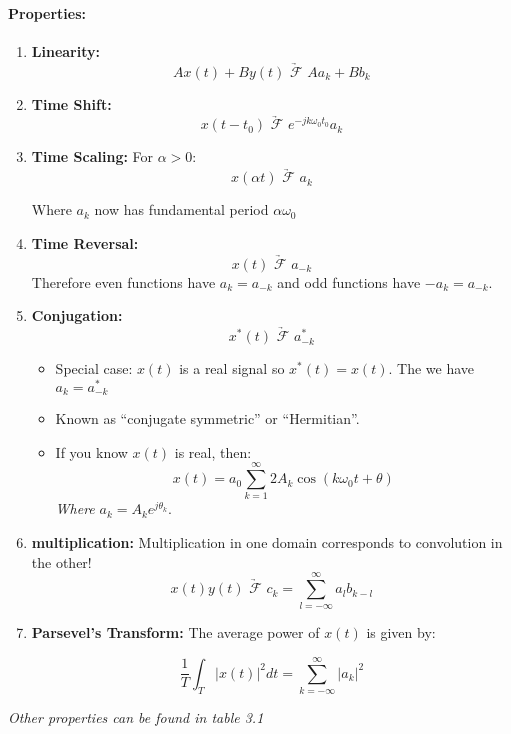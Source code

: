 \documentclass[a4paper,12pt]{report}
\begin{document}
\paragraph{Properties: } 

\begin{enumerate}
\item \textbf{Linearity: } 
\begin{equation}
Ax(t) + By(t) \underrightarrow{\,\,\mathcal{F}\,\,} Aa_k + Bb_k
\end{equation}

\item \textbf{Time Shift: } 
\begin{equation}
x(t-t_0) \underrightarrow{\,\,\mathcal{F}\,\,} e^{-jk\omega_0 t_0} a_k
\end{equation}


\item \textbf{Time Scaling: } For $\alpha > 0$: 
\begin{equation}
x(\alpha t) \underrightarrow{\,\,\mathcal{F}\,\,} a_k
\end{equation}

Where $a_k$ now has fundamental period $\alpha \omega_0$

\item \textbf{Time Reversal: } 
\begin{equation}
x(t) \underrightarrow{\,\,\mathcal{F}\,\,} a_{-k}
\end{equation}
Therefore even functions have $a_k = a_{-k}$ and odd functions have $-a_k = a_{-k}$.

\item \textbf{Conjugation: } 
\begin{equation}
x^* (t) \underrightarrow{\,\,\mathcal{F}\,\,} a_{-k}^*
\end{equation}
\begin{itemize}
\item Special case: $x(t)$ is a real signal so $x^*(t) = x(t)$. The we have $a_k = a_{-k}^*$
\item Known as ``conjugate symmetric'' or ``Hermitian''.
\item If you know $x(t)$ is real, then: $$x(t) = a_0 \sum_{k=1}^{\infty} 2 A_k \cos (k\omega_0 t + \theta)$$
\textit{Where} $a_k = A_k e^{j\theta_k}$.
\end{itemize}

\item \textbf{multiplication: } Multiplication in one domain corresponds to convolution in the other!
\begin{equation}
x(t) y(t) \underrightarrow{\,\,\mathcal{F}\,\,} c_k = \sum_{l = -\infty}^{\infty} a_l b_{k-l}
\end{equation}

\item \textbf{Parsevel's Transform: } The average power of $x(t)$ is given by: 

\begin{equation}
\frac{1}{T} \int_{T}^{} |x(t)|^2 dt = \sum_{k=-\infty}^{\infty} |a_k|^2
\end{equation}

\end{enumerate}
\textit{Other properties can be found in table 3.1}
\end{document}
